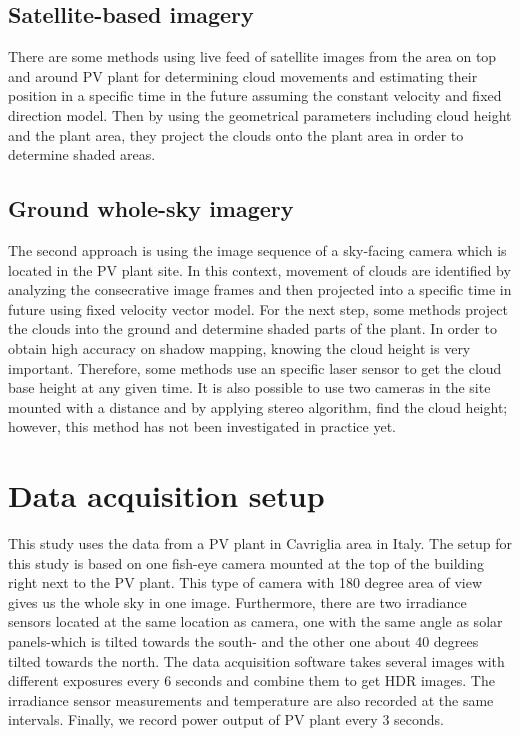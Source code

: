 \subsection{Satellite-based imagery}
There are some methods using live feed of satellite images from the area on top and around PV plant for determining cloud movements and estimating their position in a specific time in the future assuming the constant velocity and fixed direction model. Then by using the geometrical parameters including cloud height and the plant area, they project the clouds onto the plant area in order to determine shaded areas.

\subsection{Ground whole-sky imagery}
The second approach is using the image sequence of a sky-facing camera which is located in the PV plant site. In this context, movement of clouds are identified by analyzing the consecrative image frames and then projected into a specific time in future using fixed velocity vector model. For the next step, some methods project the clouds into the ground and determine shaded parts of the plant. In order to obtain high accuracy on shadow mapping, knowing the cloud height is very important. Therefore, some methods use an specific laser sensor to get the cloud base height at any given time. It is also possible to use two cameras in the site mounted with a distance and by applying stereo algorithm, find the cloud height; however, this method has not been investigated in practice yet.

\section{Data acquisition setup}
This study uses the data from a PV plant in Cavriglia area in Italy.
The setup for this study is based on one fish-eye camera mounted at the top of the building right next to the PV plant. This type of camera with 180 degree area of view gives us the whole sky in one image. Furthermore, there are two irradiance sensors located at the same location as camera, one with the same angle as solar panels-which is tilted towards the south- and the other one about 40 degrees tilted towards the north. The data acquisition software takes several images with different exposures every 6 seconds and combine them to get HDR images. The irradiance sensor measurements and temperature are also recorded at the same intervals. Finally, we record power output of PV plant every 3 seconds.


